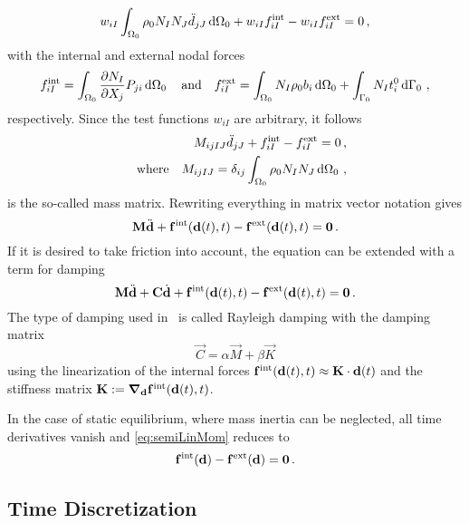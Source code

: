 \begin{equation}
    w_{iI} \int_{\Omega_0} \rho_0 N_I N_J \Ddot{d}_{jJ} \dd{\Omega_0} + w_{iI} f_{iI}^\mathrm{int} - w_{iI} f_{iI}^\mathrm{ext} = 0 \,,
\end{equation}
with the internal and external nodal forces 
\begin{equation}
    f_{iI}^\mathrm{int} = \int_{\Omega_0} \pdv{N_I}{X_j} P_{ji} \dd{\Omega_0} \qq{and}
    f_{iI}^\mathrm{ext} = \int_{\Omega_0} N_I \rho_0 b_i \dd{\Omega_0} + \int_{\Gamma_0} N_I t_i^0  \dd{\Gamma_0} \,,
\end{equation}
respectively.
Since the test functions $w_{iI}$ are arbitrary, it follows 
\begin{align}
    M_{ijIJ} \Ddot{d}_{jJ} + f_{iI}^\mathrm{int} - f_{iI}^\mathrm{ext} = 0 \,, \\
    \qq{where} M_{ijIJ} = \delta_{ij} \int_{\Omega_0} \rho_0 N_I N_J \dd{\Omega_0} \,,
\end{align}
is the so-called mass matrix.
Rewriting everything in matrix vector notation gives
\begin{equation}
    \vec M \Ddot{\d} + \vec f^\mathrm{int}(\d(t),t) - \vec f^\mathrm{ext}(\d(t),t) = \vec 0 \,.
\end{equation}
If it is desired to take friction into account, the equation can be extended with a term for damping
\begin{equation}
    \vec M \Ddot{\d} + \vec C \dot{\d} + \vec f^\mathrm{int}(\d(t),t) - \vec f^\mathrm{ext}(\d(t),t)  = \vec 0 \,. \label{eq:semiLinMom}
\end{equation}
The type of damping used in \CM~is called Rayleigh damping with the damping matrix
\begin{equation}
    \vec C = \alpha \vec M + \beta \vec K
\end{equation}
using the linearization of the internal forces $\vec f^\mathrm{int}(\d(t),t) \approx \vec K \cdot \d(t)$ and the stiffness matrix $\vec K := \grad_{\d}{\vec f^\mathrm{int}(\d(t),t)}$.

In the case of static equilibrium, where mass inertia can be neglected, all time derivatives vanish and \autoref{eq:semiLinMom} reduces to 
\begin{equation}
    \vec f^\mathrm{int}(\d) - \vec f^\mathrm{ext}(\d)  = \vec 0 \,. \label{eq:staticLinMom}
\end{equation}

\subsection{Time Discretization}

